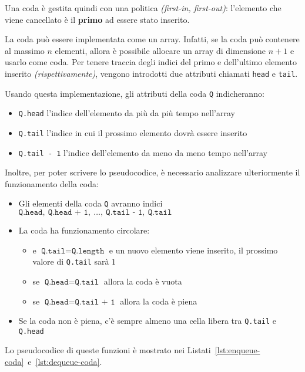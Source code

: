 \documentclass[italian, 10pt]{article}
\begin{document}
Una coda è gestita quindi con una politica \FIFO \textit{(first-in, first-out)}: l'elemento che viene cancellato è il \textbf{primo} ad essere stato inserito.

\bigskip
La coda può essere implementata come un array.
Infatti, se la coda può contenere al massimo \(n\) elementi, allora è possibile allocare un array di dimensione \(n+1\) e usarlo come coda.
Per tenere traccia degli indici del primo e dell'ultimo elemento inserito \textit{(rispettivamente)}, vengono introdotti due attributi chiamati \texttt{head} e \texttt{tail}.

Usando questa implementazione, gli attributi della coda \texttt{Q} indicheranno:

\begin{itemize}
  \item \texttt{Q.head} l'indice dell'elemento da più da più tempo nell'array
  \item \texttt{Q.tail} l'indice in cui il prossimo elemento dovrà essere inserito
  \item \texttt{Q.tail - 1} l'indice dell'elemento da meno da meno tempo nell'array
\end{itemize}

Inoltre, per poter scrivere lo pseudocodice, è necessario analizzare ulteriormente il funzionamento della coda:

\begin{itemize}
  \item Gli elementi della coda \texttt{Q} avranno indici \(\texttt{Q.head},\ \texttt{Q.head + 1},\ \ldots,\ \texttt{Q.tail - 1},\ \texttt{Q.tail}\)
  \item La coda ha funzionamento circolare:
        \begin{itemize}
          \item e \(\texttt{Q.tail} = \texttt{Q.length}\) e un nuovo elemento viene inserito, il prossimo valore di \texttt{Q.tail} sarà \(1\)
          \item se \(\texttt{Q.head} = \texttt{Q.tail}\) allora la coda è vuota
          \item se \(\texttt{Q.head} = \texttt{Q.tail + 1}\) allora la coda è piena
        \end{itemize}
  \item Se la coda non è piena, c'è sempre almeno una cella libera tra \texttt{Q.tail} e \texttt{Q.head}
\end{itemize}

\bigskip
Lo pseudocodice di queste funzioni è mostrato nei Listati~\ref{lst:enqueue-coda}~e~\ref{lst:dequeue-coda}.
\end{document}
